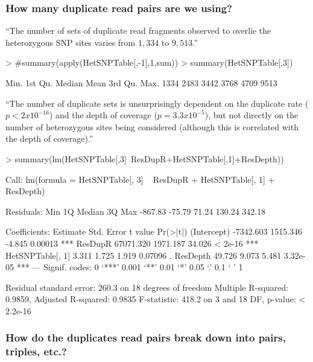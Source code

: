 \documentclass{article}
\begin{document}
\subsubsection{How many duplicate read pairs are we using?}

``The number of sets of duplicate read fragments observed to overlie the heterozygous SNP sites varies from $1,334$ to $9,513$.''

\begin{Schunk}
\begin{Sinput}
> #summary(apply(HetSNPTable[,-1],1,sum))
> summary(HetSNPTable[,3])
\end{Sinput}
\begin{Soutput}
   Min. 1st Qu.  Median    Mean 3rd Qu.    Max. 
   1334    2483    3442    3768    4709    9513 
\end{Soutput}
\end{Schunk}
``The number of duplicate sets is unsurprisingly dependent on the duplicate rate ($p < 2 x 10^{-16}$) and the depth of coverage ($p = 3.3 x 10^{-5}$), but not directly on the number of heterozygous sites being considered (although this is correlated with the depth of coverage).''

\begin{Schunk}
\begin{Sinput}
> summary(lm(HetSNPTable[,3]~ResDupR+HetSNPTable[,1]+ResDepth))
\end{Sinput}
\begin{Soutput}
Call:
lm(formula = HetSNPTable[, 3] ~ ResDupR + HetSNPTable[, 1] + 
    ResDepth)

Residuals:
    Min      1Q  Median      3Q     Max 
-867.83  -75.79   71.24  130.24  342.18 

Coefficients:
                  Estimate Std. Error t value Pr(>|t|)    
(Intercept)      -7342.603   1515.346  -4.845  0.00013 ***
ResDupR          67071.320   1971.187  34.026  < 2e-16 ***
HetSNPTable[, 1]     3.311      1.725   1.919  0.07096 .  
ResDepth            49.726      9.073   5.481 3.32e-05 ***
---
Signif. codes:  0 ‘***’ 0.001 ‘**’ 0.01 ‘*’ 0.05 ‘.’ 0.1 ‘ ’ 1

Residual standard error: 260.3 on 18 degrees of freedom
Multiple R-squared:  0.9859,	Adjusted R-squared:  0.9835 
F-statistic: 418.2 on 3 and 18 DF,  p-value: < 2.2e-16
\end{Soutput}
\end{Schunk}

\subsubsection{How do the duplicates read pairs break down into pairs, triples, etc.?}
\end{document}
